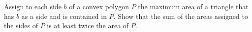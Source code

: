 Assign to each side $b$ of a convex polygon $P$ the maximum area of a triangle that has $b$ as a side and is contained in $P$. Show that the sum of the areas assigned to the sides of $P$ is at least twice the area of $P$.